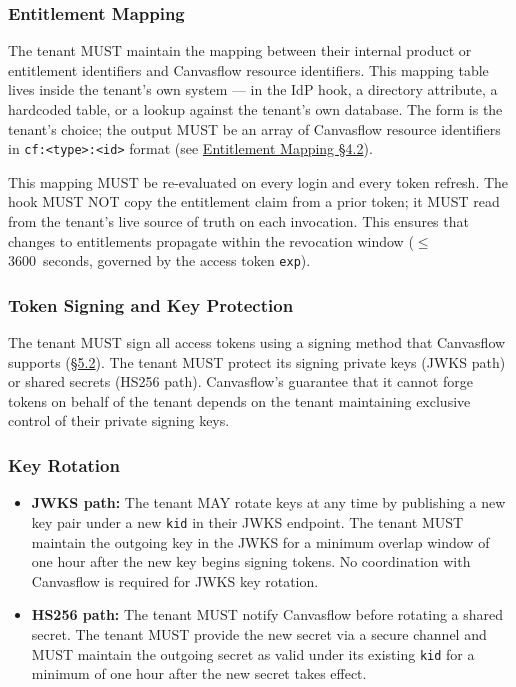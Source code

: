 \subsubsection{Entitlement Mapping}

The tenant MUST maintain the mapping between their internal product or entitlement
identifiers and Canvasflow resource identifiers. This mapping table lives inside the
tenant's own system --- in the IdP hook, a directory attribute, a hardcoded table, or a
lookup against the tenant's own database. The form is the tenant's choice; the output
MUST be an array of Canvasflow resource identifiers in \texttt{cf:<type>:<id>} format
(see \hyperref[sec:mandatory-value-format]{Entitlement Mapping \S4.2}).

This mapping MUST be re-evaluated on every login and every token refresh. The hook MUST
NOT copy the entitlement claim from a prior token; it MUST read from the tenant's live
source of truth on each invocation. This ensures that changes to entitlements propagate
within the revocation window ($\leq$ 3600~seconds, governed by the access token
\texttt{exp}).

\pagebreak

\subsubsection{Token Signing and Key Protection}

The tenant MUST sign all access tokens using a signing method that Canvasflow supports
(\hyperref[sec:signing-path-requirements]{\S5.2}). The tenant MUST protect its signing private keys (JWKS path) or shared secrets
(HS256 path). Canvasflow's guarantee that it cannot forge tokens on behalf of the tenant
depends on the tenant maintaining exclusive control of their private signing keys.

\subsubsection{Key Rotation}

\begin{itemize}
  \item \textbf{JWKS path:} The tenant MAY rotate keys at any time by publishing a new
    key pair under a new \texttt{kid} in their JWKS endpoint. The tenant MUST maintain
    the outgoing key in the JWKS for a minimum overlap window of one hour after the new
    key begins signing tokens. No coordination with Canvasflow is required for JWKS key
    rotation.

  \item \textbf{HS256 path:} The tenant MUST notify Canvasflow before rotating a shared
    secret. The tenant MUST provide the new secret via a secure channel and MUST
    maintain the outgoing secret as valid under its existing \texttt{kid} for a minimum
    of one hour after the new secret takes effect.
\end{itemize}

